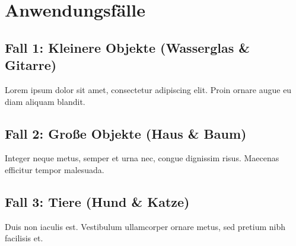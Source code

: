 \chapter{Anwendungsfälle}

\section{Fall 1: Kleinere Objekte (Wasserglas \& Gitarre)}
Lorem ipsum dolor sit amet, consectetur adipiscing elit.
Proin ornare augue eu diam aliquam blandit.
\section{Fall 2: Große Objekte (Haus \& Baum)}
Integer neque metus, semper et urna nec, congue dignissim risus.
Maecenas efficitur tempor malesuada.
\section{Fall 3: Tiere (Hund \& Katze)}
Duis non iaculis est.
Vestibulum ullamcorper ornare metus, sed pretium nibh facilisis et.
